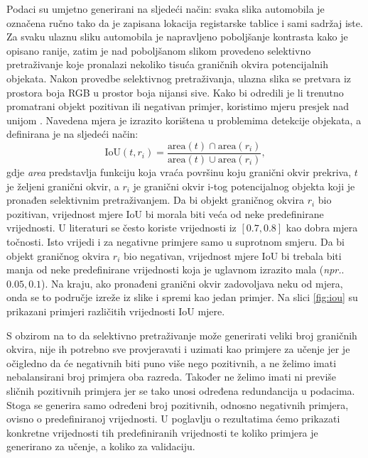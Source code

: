 \documentclass[times, utf8, diplomski]{fer}
\begin{document}
Podaci su umjetno generirani na sljedeći način: svaka slika automobila je označena ručno tako da je zapisana lokacija registarske tablice i sami sadržaj iste. Za svaku ulaznu sliku automobila je napravljeno poboljšanje kontrasta kako je opisano ranije, zatim je nad poboljšanom slikom provedeno selektivno pretraživanje koje pronalazi nekoliko tisuća graničnih okvira potencijalnih objekata. Nakon provedbe selektivnog pretraživanja, ulazna slika se pretvara iz prostora boja RGB u prostor boja nijansi sive. Kako bi odredili je li trenutno promatrani objekt pozitivan ili negativan primjer, koristimo mjeru presjek nad unijom . Navedena mjera je izrazito korištena u problemima detekcije objekata, a definirana je na sljedeći način:
\begin{equation}
    \text{IoU}(t, r_i) = \frac{\text{area}(t) \cap \text{area}(r_i)}{\text{area}(t) \cup \text{area}(r_i)},
\end{equation}
gdje \textit{area} predstavlja funkciju koja vraća površinu koju granični okvir prekriva, $t$ je željeni granični okvir, a $r_i$ je granični okvir i-tog potencijalnog objekta koji je pronađen selektivnim pretraživanjem. Da bi objekt graničnog okvira $r_i$ bio pozitivan, vrijednost mjere IoU bi morala biti veća od neke predefinirane vrijednosti. U literaturi se često koriste vrijednosti iz $[0.7, 0.8]$ kao dobra mjera točnosti. Isto vrijedi i za negativne primjere samo u suprotnom smjeru. Da bi objekt graničnog okvira $r_i$ bio negativan, vrijednost mjere IoU bi trebala biti manja od neke predefinirane vrijednosti koja je uglavnom izrazito mala (\textit{npr.}.\ $0.05, 0.1$). Na kraju, ako pronađeni granični okvir zadovoljava neku od mjera, onda se to područje izreže iz slike i spremi kao jedan primjer. Na slici \ref{fig:iou} su prikazani primjeri različitih vrijednosti IoU mjere.

S obzirom na to da selektivno pretraživanje može generirati veliki broj graničnih okvira, nije ih potrebno sve provjeravati i uzimati kao primjere za učenje jer je očigledno da će negativnih biti puno više nego pozitivnih, a ne želimo imati nebalansirani broj primjera oba razreda. Također ne želimo imati ni previše sličnih pozitivnih primjera jer se tako unosi određena redundancija u podacima. Stoga se generira samo određeni broj pozitivnih, odnosno negativnih primjera, ovisno o predefiniranoj vrijednosti. U poglavlju o rezultatima ćemo prikazati konkretne vrijednosti tih predefiniranih vrijednosti te koliko primjera je generirano za učenje, a koliko za validaciju.
\end{document}

